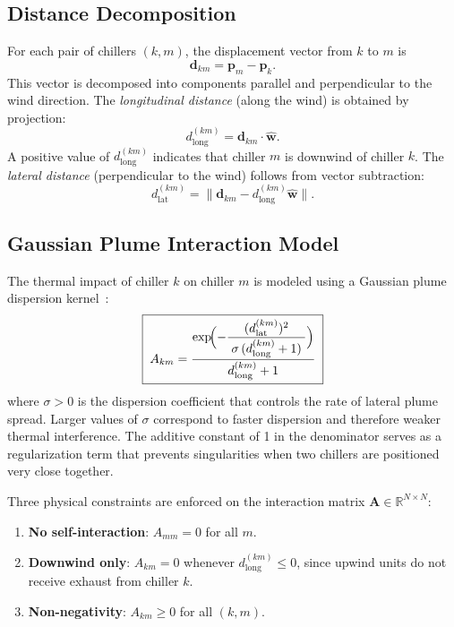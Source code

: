 \documentclass[11pt, a4paper]{article}
\newcommand{\dlong}{d_{\mathrm{long}}}
\newcommand{\dlat}{d_{\mathrm{lat}}}
\newcommand{\vwind}{\mathbf{w}}
\begin{document}
\subsection{Distance Decomposition}
\label{sec:distance-decomposition}

For each pair of chillers $(k, m)$, the displacement vector from $k$ to $m$ is
\begin{equation}
    \label{eq:displacement}
    \mathbf{d}_{km} = \mathbf{p}_m - \mathbf{p}_k.
\end{equation}
This vector is decomposed into components parallel and perpendicular to the wind direction.
The \emph{longitudinal distance} (along the wind) is obtained by projection:
\begin{equation}
    \label{eq:longitudinal}
    \dlong^{(km)} = \mathbf{d}_{km} \cdot \hat{\vwind}.
\end{equation}
A positive value of $\dlong^{(km)}$ indicates that chiller $m$ is downwind of chiller $k$.
The \emph{lateral distance} (perpendicular to the wind) follows from vector subtraction:
\begin{equation}
    \label{eq:lateral}
    \dlat^{(km)} = \bigl\| \mathbf{d}_{km} - \dlong^{(km)} \hat{\vwind} \bigr\|.
\end{equation}

\subsection{Gaussian Plume Interaction Model}
\label{sec:gaussian-plume}

The thermal impact of chiller $k$ on chiller $m$ is modeled using a Gaussian plume dispersion kernel~\cite{pasquill1961estimation, epa1995ap42}:
\begin{equation}
    \label{eq:plume}
    \boxed{\;
    A_{km} = \frac{\exp\!\Bigl(-\dfrac{(\dlat^{(km)})^2}{\;\sigma\,(\dlong^{(km)} + 1)\;}\Bigr)}{\dlong^{(km)} + 1}
    \;}
\end{equation}
where $\sigma > 0$ is the dispersion coefficient that controls the rate of lateral plume spread.
Larger values of $\sigma$ correspond to faster dispersion and therefore weaker thermal interference.
The additive constant of 1 in the denominator serves as a regularization term that prevents singularities when two chillers are positioned very close together.

Three physical constraints are enforced on the interaction matrix $\mathbf{A} \in \mathbb{R}^{N \times N}$:
\begin{enumerate}
    \item \textbf{No self-interaction}: $A_{mm} = 0$ for all $m$.
    \item \textbf{Downwind only}: $A_{km} = 0$ whenever $\dlong^{(km)} \leq 0$, since upwind units do not receive exhaust from chiller $k$.
    \item \textbf{Non-negativity}: $A_{km} \geq 0$ for all $(k, m)$.
\end{enumerate}
\end{document}
